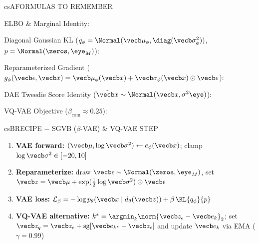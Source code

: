 \documentclass[../../../../master.tex]{subfiles}
\begin{document}
\begin{cscolumns}
\begin{cscard}{csA}{FORMULAS TO REMEMBER}
  \begin{csbul}
    \item ELBO \& Marginal Identity:
    \item Diagonal Gaussian KL ($q_\phi=\Normal(\vecb\mu_\phi,\diag(\vecb\sigma_\phi^2))$, $p=\Normal(\zeros,\eye_M)$):
    \item Reparameterized Gradient ($g_\phi(\vecb\epsilon,\vecb x)=\vecb\mu_\phi(\vecb x)+\vecb\sigma_\phi(\vecb x)\odot\vecb\epsilon$):
    \item DAE Tweedie Score Identity ($\tilde{\vecb x}\sim\Normal(\vecb x,\sigma^2\eye)$):
    \item VQ-VAE Objective ($\beta_{\mathrm{com}}\approx 0.25$):
  \end{csbul}
\end{cscard}

\begin{cscard}{csB}{RECIPE $-$ SGVB ($\beta$-VAE) \& VQ-VAE STEP}
  \begin{enumerate}[leftmargin=1.2em, itemsep=1pt, topsep=1pt, parsep=0pt]
    \item \textbf{VAE forward:} $(\vecb\mu,\log\vecb\sigma^2)\leftarrow e_\phi(\vecb x)$; clamp $\log\vecb\sigma^2\in[-20,10]$
    \item \textbf{Reparameterize:} draw $\vecb\epsilon\sim\Normal(\zeros,\eye_M)$, set $\vecb z=\vecb\mu+\exp(\tfrac{1}{2}\log\vecb\sigma^2)\odot\vecb\epsilon$
    \item \textbf{VAE loss:} $\mathcal L_\beta=-\log p_\theta(\vecb x\mid d_\theta(\vecb z))+\beta\,\KL{q_\phi}{p}$
    \item \textbf{VQ-VAE alternative:} $k^*=\argmin_k\norm{\vecb z_e-\vecb e_k}_2$; set $\vecb z_q=\vecb z_e+\operatorname{sg}[\vecb e_{k^*}-\vecb z_e]$ and update $\vecb e_k$ via EMA ($\gamma=0.99$)
  \end{enumerate}
\end{cscard}
\columnbreak


\end{cscolumns}
\end{document}
